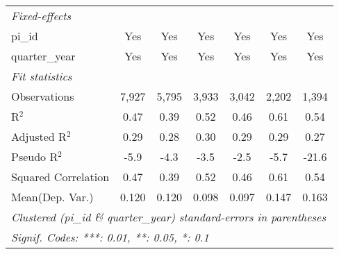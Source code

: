 \begin{tabular}{lcccccc}
   \emph{Fixed-effects}\\
   pi\_id                                                     & Yes            & Yes            & Yes           & Yes           & Yes            & Yes\\  
   quarter\_year                                              & Yes            & Yes            & Yes           & Yes           & Yes            & Yes\\  
   \midrule
   \emph{Fit statistics}\\
   Observations                                               & 7,927          & 5,795          & 3,933         & 3,042         & 2,202          & 1,394\\  
   R$^2$                                                      & 0.47           & 0.39           & 0.52          & 0.46          & 0.61           & 0.54\\  
   Adjusted R$^2$                                             & 0.29           & 0.28           & 0.30          & 0.29          & 0.29           & 0.27\\  
   Pseudo R$^2$                                               & -5.9           & -4.3           & -3.5          & -2.5          & -5.7           & -21.6\\  
   Squared Correlation                                        & 0.47           & 0.39           & 0.52          & 0.46          & 0.61           & 0.54\\  
Mean(Dep. Var.) & 0.120 & 0.120 & 0.098 & 0.097 & 0.147 & 0.163 \\
   \midrule \midrule
   \multicolumn{7}{l}{\emph{Clustered (pi\_id \& quarter\_year) standard-errors in parentheses}}\\
   \multicolumn{7}{l}{\emph{Signif. Codes: ***: 0.01, **: 0.05, *: 0.1}}\\
\end{tabular}
\par\endgroup

